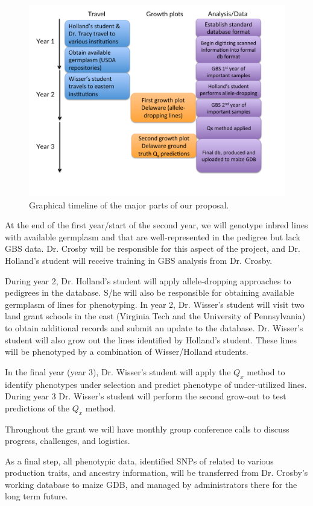 \documentclass[12pt]{article}
\begin{document}
\begin{figure}
\centering
\includegraphics[width=0.7\linewidth]{timeline.pdf}
\caption{Graphical timeline of the major parts of our proposal.}
\label{fig:timeline}
\end{figure}

At the end of the first year/start of the second year, we will genotype inbred lines with available germplasm and that are well-represented in the pedigree but lack GBS data. 
Dr. Crosby will be responsible for this aspect of the project, and Dr. Holland's student will receive training in GBS analysis from Dr. Crosby. 

During year 2, Dr. Holland's student will apply allele-dropping approaches to pedigrees in the database. 
S/he will also be responsible for obtaining available germplasm of lines for phenotyping. 
In year 2, Dr. Wisser's student will visit two land grant schools in the east (Virginia Tech and the University of Pennsylvania) to obtain additional records and submit an update to the database. 
Dr. Wisser's student will also grow out the lines identified by Holland's student. 
These lines will be phenotyped by a combination of Wisser/Holland students.

In the final year (year 3), Dr. Wisser's student will apply the $Q_{x}$ method to identify phenotypes under selection and predict phenotype of under-utilized lines.
During year 3 Dr. Wisser's student will perform the second grow-out to test predictions of the $Q_{x}$ method.

Throughout the grant we will have monthly group conference calls to discuss progress, challenges, and logistics. 

As a final step, all phenotypic data, identified SNPs of related to various production traits, and ancestry information, will be transferred from Dr. Crosby's working database to maize GDB, and managed by administrators there for the long term future.
\end{document}
